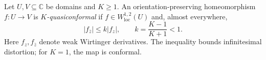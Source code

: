 
Let $U,V\subseteq\mathbb C$ be domains and $K\ge1$. An orientation-preserving homeomorphism $f:U\to V$ is \emph{$K$-quasiconformal} if $f\in W^{1,2}_{\mathrm{loc}}(U)$ and, almost everywhere,
\[
|f_{\overline z}|\le k|f_z|,\qquad k=\frac{K-1}{K+1}<1.
\]
Here $f_z,f_{\overline z}$ denote weak Wirtinger derivatives. The inequality bounds infinitesimal distortion; for $K=1$, the map is conformal.
